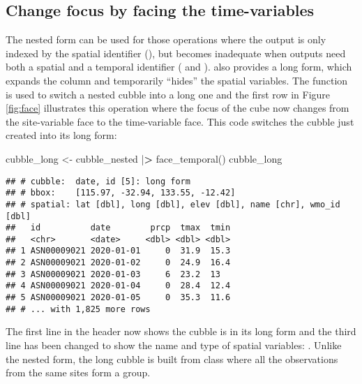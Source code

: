 \documentclass{article}
\newenvironment{Shaded}{\begin{snugshade}}{\end{snugshade}}
\newcommand{\ErrorTok}[1]{\textcolor[rgb]{0.64,0.00,0.00}{\textbf{#1}}}
\newcommand{\FunctionTok}[1]{\textcolor[rgb]{0.00,0.00,0.00}{#1}}
\newcommand{\NormalTok}[1]{#1}
\newcommand{\OtherTok}[1]{\textcolor[rgb]{0.56,0.35,0.01}{#1}}
\newcommand{\SpecialCharTok}[1]{\textcolor[rgb]{0.00,0.00,0.00}{#1}}
\begin{document}
\hypertarget{change-focus-by-facing-the-time-variables}{%
\subsection{Change focus by facing the time-variables}\label{change-focus-by-facing-the-time-variables}}

The nested form can be used for those operations where the output is only indexed by the spatial identifier (), but becomes inadequate when outputs need both a spatial and a temporal identifier ( and ).  also provides a long form, which expands the  column and temporarily ``hides'' the spatial variables. The function  is used to switch a nested cubble into a long one and the first row in Figure \ref{fig:face} illustrates this operation where the focus of the cube now changes from the site-variable face to the time-variable face. This code switches the cubble just created into its long form:

\begin{Shaded}
\begin{Highlighting}[]
\NormalTok{cubble\_long }\OtherTok{\textless{}{-}}\NormalTok{ cubble\_nested }\SpecialCharTok{|}\ErrorTok{\textgreater{}} \FunctionTok{face\_temporal}\NormalTok{()}
\NormalTok{cubble\_long}
\end{Highlighting}
\end{Shaded}

\begin{verbatim}
## # cubble:  date, id [5]: long form
## # bbox:    [115.97, -32.94, 133.55, -12.42]
## # spatial: lat [dbl], long [dbl], elev [dbl], name [chr], wmo_id [dbl]
##   id          date        prcp  tmax  tmin
##   <chr>       <date>     <dbl> <dbl> <dbl>
## 1 ASN00009021 2020-01-01     0  31.9  15.3
## 2 ASN00009021 2020-01-02     0  24.9  16.4
## 3 ASN00009021 2020-01-03     6  23.2  13  
## 4 ASN00009021 2020-01-04     0  28.4  12.4
## 5 ASN00009021 2020-01-05     0  35.3  11.6
## # ... with 1,825 more rows
\end{verbatim}

The first line in the header now shows the cubble is in its long form and the third line has been changed to show the name and type of spatial variables: . Unlike the nested form, the long cubble is built from class  where all the observations from the same sites form a group.
\end{document}
